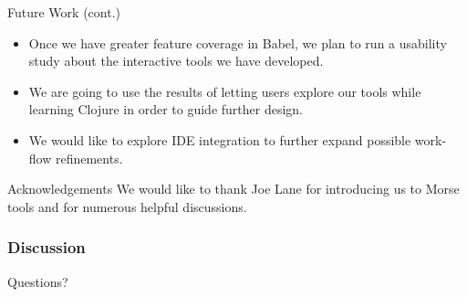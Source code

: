 \documentclass{beamer}
\begin{document}
\begin{frame}{Future Work (cont.)}
  \begin{itemize}
    \item<1-> Once we have greater feature coverage in Babel, we plan to run a usability study about the interactive tools we have developed.
    \item<2-> We are going to use the results of letting users explore our tools while learning Clojure in order to guide further design. 
    \item<3-> We would like to explore IDE integration to further expand possible work-flow refinements.
  \end{itemize}
\end{frame}

\begin{frame}{Acknowledgements}
  We would like to thank Joe Lane for introducing us to Morse tools and for numerous helpful discussions.
\end{frame}

\begin{frame}
  \frametitle{Discussion}
Questions?
\end{frame}
\end{document}
